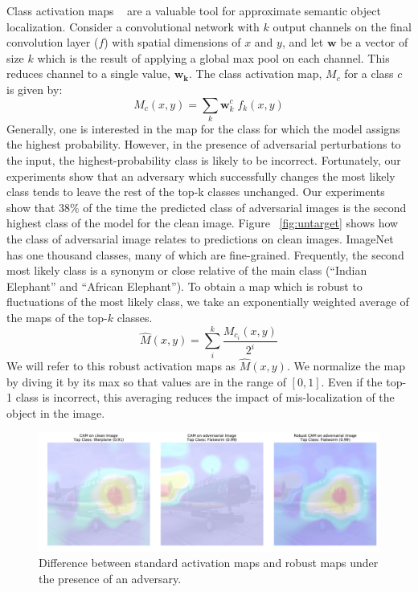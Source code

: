 Class activation maps ~\cite{CAMZhou2016LearningDF} are a valuable tool for approximate semantic object localization.
Consider a convolutional network with $k$ output channels on the final convolution layer ($f$) with spatial dimensions of $x$ and $y$, and let $\boldsymbol{w}$ be a vector of size $k$ which is the result of applying a global max pool on each channel. 
This reduces channel to a single value, $\boldsymbol{w_k}$.
The class activation map, $M_c$ for a class $c$ is given by:
\begin{equation}
M_c(x,y) = \sum_k \boldsymbol{w}_k^c \; f_k(x,y)
\end{equation}
Generally, one is interested in the map for the class for which the model assigns the highest probability.
However, in the presence of adversarial perturbations to the input, the highest-probability class is likely to be incorrect.
Fortunately, our experiments show that an adversary which successfully changes the most likely class tends to leave the rest of the top-k classes unchanged.
Our experiments show that $38\%$ of the time the predicted class of adversarial images is the second highest class of the model for the clean image. 
Figure ~\ref{fig:untarget} shows how the class of adversarial image relates to predictions on clean images.
ImageNet has one thousand classes, many of which are fine-grained. 
Frequently, the second most likely class is a synonym or close relative of the main class (\eg ``Indian Elephant'' and ``African Elephant'').
To obtain a map which is robust to fluctuations of the most likely class, we take an exponentially weighted average of the maps of the top-$k$ classes. 
\begin{equation}
	\widehat{M}(x,y) = \sum_i^k \frac{M_{c_i}(x,y)}{2^i}
\end{equation}
We will refer to this robust activation maps as $\widehat{M}(x,y)$. 
We normalize the map by diving it by its max so that values are in the range of $[0,1]$. %
Even if the top-1 class is incorrect, this averaging reduces the impact of mis-localization of the object in the image. 
\begin{figure}[H]
   \includegraphics[width=1\linewidth]{figures/pixel/robust_cam.pdf}
   \caption[Robust Activation Maps]{Difference between standard activation maps and robust maps under the presence of an adversary.}
   \label{fig:robustcam}
\end{figure}

